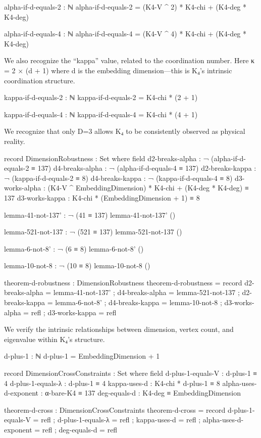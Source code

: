 \documentclass[11pt,a4paper]{book}
\begin{document}
\begin{code}
alpha-if-d-equals-2 : ℕ
alpha-if-d-equals-2 = (K4-V ^ 2) * K4-chi + (K4-deg * K4-deg)

alpha-if-d-equals-4 : ℕ
alpha-if-d-equals-4 = (K4-V ^ 4) * K4-chi + (K4-deg * K4-deg)

\end{code}

We also recognize the ``kappa'' value, related to the coordination number.
Here κ = 2 × (d + 1) where d is the embedding dimension—this is K₄'s intrinsic coordination structure.

\begin{code}
kappa-if-d-equals-2 : ℕ
kappa-if-d-equals-2 = K4-chi * (2 + 1)

kappa-if-d-equals-4 : ℕ
kappa-if-d-equals-4 = K4-chi * (4 + 1)
\end{code}

We recognize that only D=3 allows K₄ to be consistently observed as physical reality.

\begin{code}
record DimensionRobustness : Set where
  field
    d2-breaks-alpha  : ¬ (alpha-if-d-equals-2 ≡ 137)
    d4-breaks-alpha  : ¬ (alpha-if-d-equals-4 ≡ 137)
    d2-breaks-kappa  : ¬ (kappa-if-d-equals-2 ≡ 8)
    d4-breaks-kappa  : ¬ (kappa-if-d-equals-4 ≡ 8)
    d3-works-alpha   : (K4-V ^ EmbeddingDimension) * K4-chi + (K4-deg * K4-deg) ≡ 137
    d3-works-kappa   : K4-chi * (EmbeddingDimension + 1) ≡ 8

lemma-41-not-137' : ¬ (41 ≡ 137)
lemma-41-not-137' ()

lemma-521-not-137 : ¬ (521 ≡ 137)
lemma-521-not-137 ()

lemma-6-not-8' : ¬ (6 ≡ 8)
lemma-6-not-8' ()

lemma-10-not-8 : ¬ (10 ≡ 8)
lemma-10-not-8 ()

theorem-d-robustness : DimensionRobustness
theorem-d-robustness = record
  { d2-breaks-alpha  = lemma-41-not-137'
  ; d4-breaks-alpha  = lemma-521-not-137
  ; d2-breaks-kappa  = lemma-6-not-8'
  ; d4-breaks-kappa  = lemma-10-not-8
  ; d3-works-alpha   = refl
  ; d3-works-kappa   = refl
  }
\end{code}

We verify the intrinsic relationships between dimension, vertex count, and eigenvalue within K₄'s structure.

\begin{code}
d-plus-1 : ℕ
d-plus-1 = EmbeddingDimension + 1

record DimensionCrossConstraints : Set where
  field
    d-plus-1-equals-V     : d-plus-1 ≡ 4
    d-plus-1-equals-λ     : d-plus-1 ≡ 4
    kappa-uses-d          : K4-chi * d-plus-1 ≡ 8
    alpha-uses-d-exponent : α-bare-K4 ≡ 137
    deg-equals-d          : K4-deg ≡ EmbeddingDimension

theorem-d-cross : DimensionCrossConstraints
theorem-d-cross = record
  { d-plus-1-equals-V     = refl
  ; d-plus-1-equals-λ     = refl
  ; kappa-uses-d          = refl
  ; alpha-uses-d-exponent = refl
  ; deg-equals-d          = refl
  }
\end{code}
\end{document}
